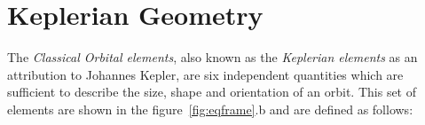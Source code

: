\newpage

\section{Keplerian Geometry}
The \textit{Classical Orbital elements}, also known as the \textit{Keplerian elements} as an attribution to Johannes Kepler, are six independent quantities which are sufficient to describe the size, shape and orientation of an orbit. This set of elements are shown in the figure~\ref{fig:eqframe}.b and are defined as follows:

